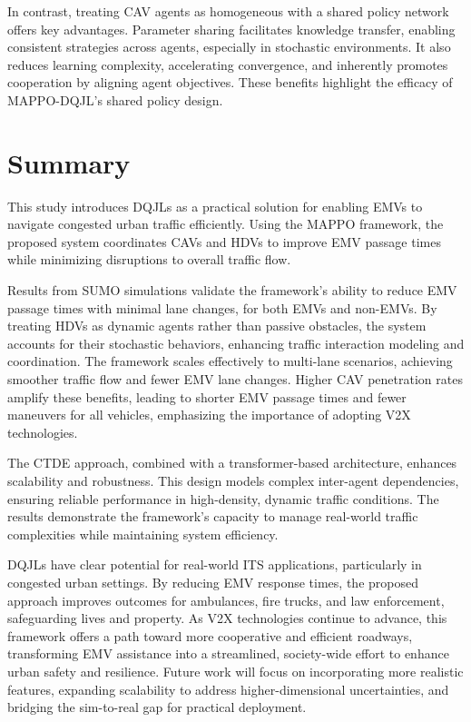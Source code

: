 In contrast, treating CAV agents as homogeneous with a shared policy network offers key advantages. Parameter sharing facilitates knowledge transfer, enabling consistent strategies across agents, especially in stochastic environments. It also reduces learning complexity, accelerating convergence, and inherently promotes cooperation by aligning agent objectives. These benefits highlight the efficacy of MAPPO-DQJL’s shared policy design.

\section{Summary}
\label{sec:conclusion}

This study introduces DQJLs as a practical solution for enabling EMVs to navigate congested urban traffic efficiently. Using the MAPPO framework, the proposed system coordinates CAVs and HDVs to improve EMV passage times while minimizing disruptions to overall traffic flow.

Results from SUMO simulations validate the framework’s ability to reduce EMV passage times with minimal lane changes, for both EMVs and non-EMVs. By treating HDVs as dynamic agents rather than passive obstacles, the system accounts for their stochastic behaviors, enhancing traffic interaction modeling and coordination. The framework scales effectively to multi-lane scenarios, achieving smoother traffic flow and fewer EMV lane changes. Higher CAV penetration rates amplify these benefits, leading to shorter EMV passage times and fewer maneuvers for all vehicles, emphasizing the importance of adopting V2X technologies.

The CTDE approach, combined with a transformer-based architecture, enhances scalability and robustness. This design models complex inter-agent dependencies, ensuring reliable performance in high-density, dynamic traffic conditions. The results demonstrate the framework’s capacity to manage real-world traffic complexities while maintaining system efficiency.

DQJLs have clear potential for real-world ITS applications, particularly in congested urban settings. By reducing EMV response times, the proposed approach improves outcomes for ambulances, fire trucks, and law enforcement, safeguarding lives and property. As V2X technologies continue to advance, this framework offers a path toward more cooperative and efficient roadways, transforming EMV assistance into a streamlined, society-wide effort to enhance urban safety and resilience. Future work will focus on incorporating more realistic features, expanding scalability to address higher-dimensional uncertainties, and bridging the sim-to-real gap for practical deployment.